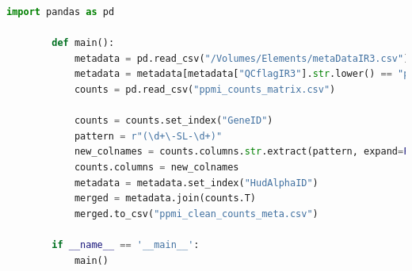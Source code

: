 \documentclass[12pt]{report}
\begin{document}
    \begin{lstlisting}[language=Python,caption={prepare-data.py: Εισαγωγή Metadata και φιλτράρισμα ακατάλληλων δειγμάτων},label=lst:preparedatapy]
        import pandas as pd
    
        def main():
            metadata = pd.read_csv("/Volumes/Elements/metaDataIR3.csv")
            metadata = metadata[metadata["QCflagIR3"].str.lower() == "pass"]
            counts = pd.read_csv("ppmi_counts_matrix.csv")
        
            counts = counts.set_index("GeneID")
            pattern = r"(\d+\-SL-\d+)"
            new_colnames = counts.columns.str.extract(pattern, expand=False)
            counts.columns = new_colnames
            metadata = metadata.set_index("HudAlphaID")
            merged = metadata.join(counts.T)
            merged.to_csv("ppmi_clean_counts_meta.csv")
        
        if __name__ == '__main__':
            main()
    \end{lstlisting}
\end{document}
